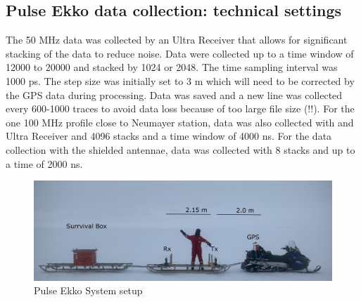 \documentclass[a4paper,12pt]{article}
\begin{document}
\subsection{Pulse Ekko data collection: technical settings}
The 50 MHz data was collected by an Ultra Receiver that allows for significant stacking of the data to reduce noise. Data were collected up to a time window of 12000 to 20000 and stacked by 1024 or 2048. The time sampling interval was 1000 ps. The step size was initially set to 3 m which will need to be corrected by the GPS data during processing. Data was saved and a new line was collected every 600-1000 traces to avoid data loss because of too large file size (!!). For the one 100 MHz profile close to Neumayer station, data was also collected with and Ultra Receiver and 4096 stacks and a time window of 4000 ns. For the data collection with the shielded antennae, data was collected with 8 stacks and up to a time of 2000 ns.
\begin{figure}[H]
\includegraphics[width=\textwidth]{Figures/PulseEkko/RadarSetup.png}
\caption{Pulse Ekko System setup}
\label{fig_PE}
\end{figure}
\end{document}
